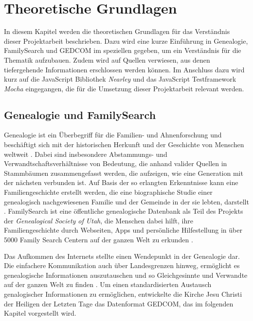 \chapter{Theoretische Grundlagen}
\label{chap: Theoretische Grundlagen}
In diesem Kapitel werden die theoretischen Grundlagen für das Verständnis dieser Projektarbeit beschrieben. Dazu wird eine kurze Einführung in Genealogie, FamilySearch und GEDCOM im speziellen gegeben, um ein Verständnis für die Thematik aufzubauen. Zudem wird auf Quellen verwiesen, aus denen tiefergehende Informationen erschlossen werden können. Im Anschluss dazu wird kurz auf die JavaScript Bibliothek \textit{Nearley} und das JavaScript Testframework \textit{Mocha} eingegangen, die für die Umsetzung dieser Projektarbeit relevant werden.

\section{Genealogie und FamilySearch}
\label{sec: Genealogie und FamilySearch}
Genealogie ist ein Überbegriff für die Familien- und Ahnenforschung und beschäftigt sich mit der historischen Herkunft und der Geschichte von Menschen weltweit \cite{AhnenforschungDE}. Dabei sind insbesondere Abstammungs- und Verwandtschaftsverhältnisse von Bedeutung, die anhand valider Quellen in Stammbäumen zusammengefasst werden, die aufzeigen, wie eine Generation mit der nächsten verbunden ist. Auf Basis der so erlangten Erkenntnisse kann eine Familiengeschichte erstellt werden, die eine biographische Studie einer genealogisch nachgewiesenen Familie und der Gemeinde in der sie lebten, darstellt \cite{SocietyOfGenealogists}. FamilySearch ist eine öffentliche genealogische Datenbank als Teil des Projekts der \textit{Genealogical Society of Utah}, die Menschen dabei hilft, ihre Familiengeschichte durch Webseiten, Apps und persönliche Hilfestellung in über 5000 Family Search Centern auf der ganzen Welt zu erkunden \cite{FamilySearchAbout}.

Das Aufkommen des Internets stellte einen Wendepunkt in der Genealogie dar. Die einfachere Kommunikation auch über Landesgrenzen hinweg, ermöglicht es genealogische Informationen auszutauschen und so Gleichgesinnte und Verwandte auf der ganzen Welt zu finden \cite{AhnenforschungDE}. Um einen standardisierten Austausch genalogischer Informationen zu ermöglichen, entwickelte die Kirche Jesu Christi der Heiligen der Letzten Tage das Datenformat GEDCOM, das im folgenden Kapitel vorgestellt wird.
\newpage
